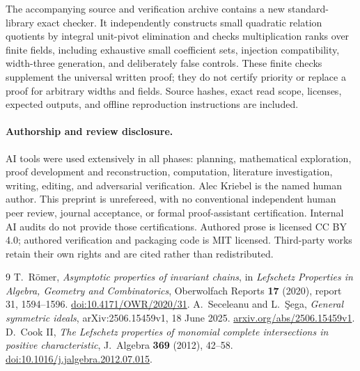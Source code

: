 \documentclass[11pt]{article}
\theoremstyle{definition}
\begin{document}
The accompanying source and verification archive contains a new
standard-library exact checker. It independently constructs small
quadratic relation quotients by integral unit-pivot elimination and checks
multiplication ranks over finite fields, including exhaustive small
coefficient sets, injection compatibility, width-three generation, and
deliberately false controls. These finite checks supplement the universal
written proof; they do not certify priority or replace a proof for arbitrary
widths and fields. Source hashes, exact read scope, licenses, expected
outputs, and offline reproduction instructions are included.

\paragraph{Authorship and review disclosure.}
AI tools were used extensively in all phases: planning, mathematical
exploration, proof development and reconstruction, computation,
literature investigation, writing, editing, and adversarial verification.
Alec Kriebel is the named human author. This preprint is unrefereed,
with no conventional independent human peer review, journal acceptance,
or formal proof-assistant certification. Internal AI audits do not provide
those certifications. Authored prose is licensed CC BY 4.0; authored
verification and packaging code is MIT licensed. Third-party works
retain their own rights and are cited rather than redistributed.

\begin{thebibliography}{9}\small
{} T.~R\"omer, \emph{Asymptotic properties of invariant chains},
in \emph{Lefschetz Properties in Algebra, Geometry and Combinatorics},
Oberwolfach Reports \textbf{17} (2020), report 31, 1594--1596.
\href{https://doi.org/10.4171/OWR/2020/31}{doi:10.4171/OWR/2020/31}.
 A.~Seceleanu and L.~\c Sega,
\emph{General symmetric ideals}, arXiv:2506.15459v1, 18 June 2025.
\href{https://arxiv.org/abs/2506.15459v1}{arxiv.org/abs/2506.15459v1}.
 D.~Cook II,
\emph{The Lefschetz properties of monomial complete intersections in positive characteristic},
J.~Algebra \textbf{369} (2012), 42--58.
\href{https://doi.org/10.1016/j.jalgebra.2012.07.015}{doi:10.1016/j.jalgebra.2012.07.015}.
\end{thebibliography}
\end{document}
